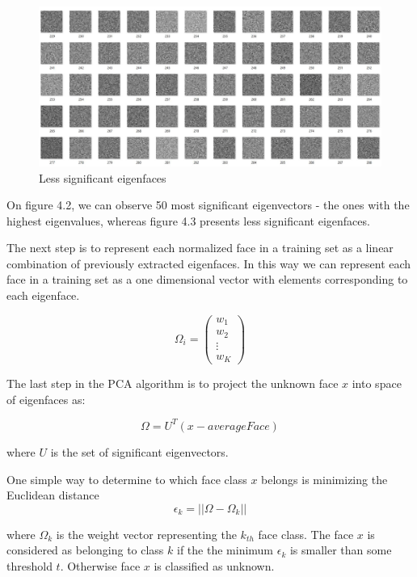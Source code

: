 \begin{figure}[H]
\centering
\includegraphics[scale=0.45]{eigenfaces_worse.jpg}
\caption{Less significant eigenfaces }
\end{figure}

On figure 4.2, we can observe 50 most significant eigenvectors - the ones with the highest eigenvalues, whereas figure 4.3 presents less significant eigenfaces. 

The next step is to represent each normalized face in a training set as a linear combination of previously extracted eigenfaces. In this way we can represent each face in a training set as a one dimensional vector with elements corresponding to each eigenface. 

\begin{equation}
\Omega_{i} =  \begin{pmatrix}
 w_{1} \\
 w_{2} \\
  \vdots  \\
 w_{K} 
 \end{pmatrix}
\end{equation}
 
The last step in the PCA algorithm is to project the unknown face  $x$ into space of eigenfaces as:

\begin{equation}
\Omega = U^{T} (x - averageFace) 
\end{equation}

where $U$ is the set of significant eigenvectors.

One simple way to determine to which face class $x$ belongs is minimizing the Euclidean distance 
\begin{equation}
\epsilon_{k} = ||\Omega - \Omega_{k}||
\end{equation}

where $\Omega_{k}$ is the weight vector representing the $k_{th}$ face class. The face $x$ is considered as belonging to class $k$ if the the minimum $\epsilon_{k}$ is smaller than some threshold $t$. Otherwise face $x$ is classified as unknown.

